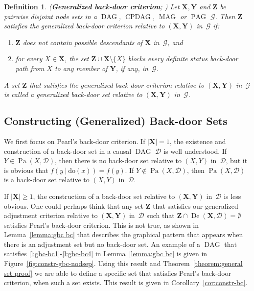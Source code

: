 \documentclass[11pt,a4paper]{article}
\newtheorem{definition}{Definition}
\newcommand{\ddo}{\textrm{do}}
\newcommand\given[1][]{\:#1\vert\:}
\DeclareMathOperator{\CPDAG}{CPDAG}
\DeclareMathOperator{\DAG}{DAG}
\DeclareMathOperator{\MAG}{MAG}
\DeclareMathOperator{\PAG}{PAG}
\DeclareMathOperator{\De}{De}
\DeclareMathOperator{\Pa}{Pa}
\newcommand{\g}[1][G]{\mathcal{#1}}
\begin{document}
\begin{definition}{(\textbf{Generalized back-door criterion}; \citealp{maathuis2013generalized})} Let $\mathbf{X,Y}$ and $\mathbf{Z}$ be pairwise disjoint node sets in a $\DAG$, $\CPDAG$, $\MAG$ or $\PAG$ $\g$. Then $\mathbf{Z}$ satisfies the generalized back-door criterion relative to $(\mathbf{X,Y})$ in~$\g$ if:
\begin{enumerate}[label=(\roman*)]
\item\label{gbc:cond1} $\mathbf{Z}$ does not contain possible descendants of $\mathbf{X}$ in~$\g$, and
\item\label{gbc:cond2} for every $X \in \mathbf{X}$, the set $\mathbf{Z} \cup \mathbf{X} \setminus \{X\}$ blocks every definite status back-door path from $X$ to any member of $\mathbf{Y}$, if any, in~$\g$.
\end{enumerate}
A set $\mathbf{Z}$ that satisfies the generalized back-door criterion relative to $(\mathbf{X,Y})$ in~$\g$ is called a generalized back-door set relative to $(\mathbf{X,Y})$ in~$\g$.
\label{def:gbc}
\end{definition}

\subsection{Constructing (Generalized) Back-door Sets} \label{subsec:GBC}

We first focus on Pearl's back-door criterion. If $|\mathbf{X}| = 1$, the existence and construction of a back-door set in a causal $\DAG$ $\g[D]$ is well understood.
If $Y \in \Pa(X,\g[D])$, then there is no back-door set relative to $(X,Y)$ in~$\g[D]$, but it is obvious that $f(y \given \ddo(x)) = f(y)$. If $Y \notin \Pa(X,\g[D])$, then $\Pa(X,\g[D])$ is a back-door set relative  to $(X,Y)$ in~$\g[D]$.

If $|\mathbf{X}| \geq 1$, the construction of a back-door set relative to $(\mathbf{X,Y})$ in~$\g[D]$ is less obvious. One could perhaps think that any set $\mathbf{Z}$ that satisfies our generalized adjustment criterion relative to $(\mathbf{X,Y})$ in~$\g[D]$ such that $\mathbf{Z} \cap \De(\mathbf{X},\g[D])=\emptyset$ satisfies Pearl's back-door criterion. This is not true, as shown in Lemma~\ref{lemma:gbc bc} that describes the graphical pattern that appears when there is an adjustment set but no back-door set. An example of a $\DAG$ that satisfies \ref{l:gbc-bc1}-\ref{l:gbc-bc4} in Lemma~\ref{lemma:gbc bc} is given in Figure~\ref{fig:constr-gbc-nodsep}. 
Using this result and Theorem~\ref{theorem:general set proof} we are able to define a specific set that satisfies Pearl's back-door criterion, when such a set exists. This result is given in Corollary~\ref{cor:constr-bc}.
\end{document}
